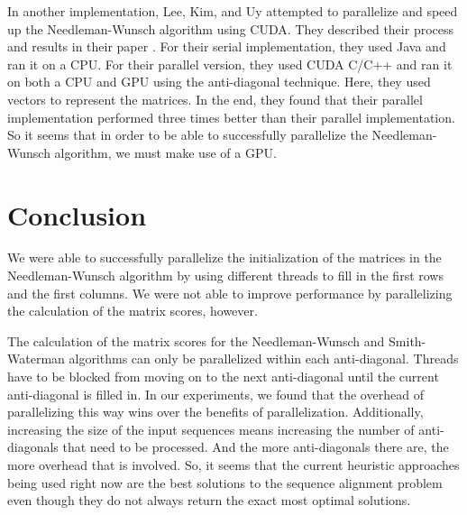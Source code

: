 \documentclass[conference]{IEEEtran}
\begin{document}
In another implementation, Lee, Kim, and Uy attempted to parallelize and speed up the Needleman-Wunsch algorithm using CUDA. They described their process and results in their paper \cite{lee_kim_uy_2020}. For their serial implementation, they used Java and ran it on a CPU. For their parallel version, they used CUDA C/C++ and ran it on both a CPU and GPU using the anti-diagonal technique. Here, they used vectors to represent the matrices. In the end, they found that their parallel implementation performed three times better than their parallel implementation. So it seems that in order to be able to successfully parallelize the Needleman-Wunsch algorithm, we must make use of a GPU.

\section{Conclusion}
We were able to successfully parallelize the initialization of the matrices in the Needleman-Wunsch algorithm by using different threads to fill in the first rows and the first columns. We were not able to improve performance by parallelizing the calculation of the matrix scores, however.

The calculation of the matrix scores for the Needleman-Wunsch and Smith-Waterman algorithms can only be parallelized within each anti-diagonal. Threads have to be blocked from moving on to the next anti-diagonal until the current anti-diagonal is filled in. In our experiments, we found that the overhead of parallelizing this way wins over the benefits of parallelization. Additionally, increasing the size of the input sequences means increasing the number of anti-diagonals that need to be processed. And the more anti-diagonals there are, the more overhead that is involved. So, it seems that the current heuristic approaches being used right now are the best solutions to the sequence alignment problem even though they do not always return the exact most optimal solutions.



\end{document}

